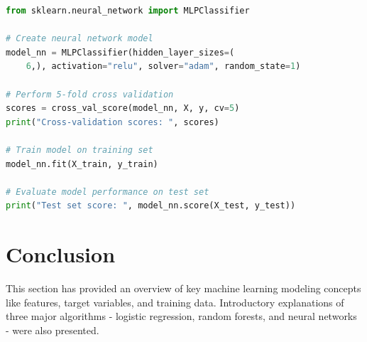 \begin{lstlisting}[language=Python]
from sklearn.neural_network import MLPClassifier

# Create neural network model
model_nn = MLPClassifier(hidden_layer_sizes=(
	6,), activation="relu", solver="adam", random_state=1)

# Perform 5-fold cross validation
scores = cross_val_score(model_nn, X, y, cv=5)
print("Cross-validation scores: ", scores)

# Train model on training set
model_nn.fit(X_train, y_train)

# Evaluate model performance on test set
print("Test set score: ", model_nn.score(X_test, y_test))

\end{lstlisting}

\section{Conclusion}
\label{sec:model:conclusion}



This section has provided an overview of key machine learning modeling concepts like features, target variables, and training data. Introductory explanations of three major algorithms - logistic regression, 
random forests, and neural networks - were also presented. 
